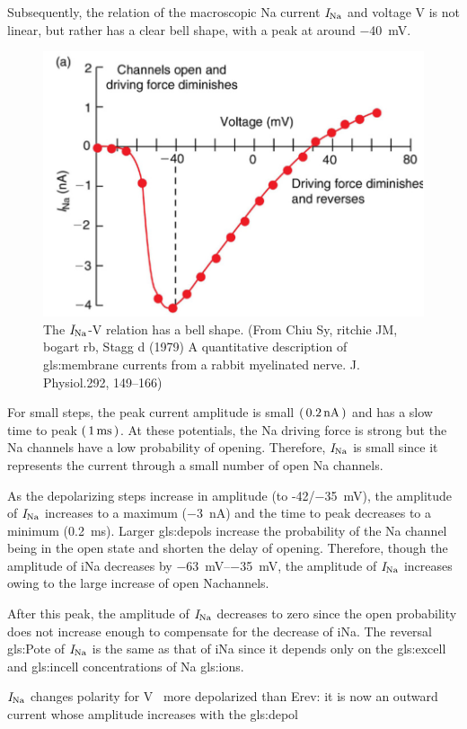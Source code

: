 \documentclass[class={myRUCProject}, crop=false]{standalone}
\begin{document}
Subsequently, the relation of the macroscopic \gls{Na} current \(\mathit{I}_\mathrm{Na}\) and voltage \(\unit{\V}\) is not linear, but rather has a clear bell shape, with a peak at around \qty{-40}{\mV}. 
\begin{figure}[H]
  \centering
  \includegraphics[width=0.5\linewidth]{Pictures//Anakin/I-V.bell.png}
  \caption{The \(\mathit{I}_\mathrm{Na}\)-V relation has a bell shape. (From Chiu Sy, ritchie JM, bogart rb, Stagg d (1979) A quantitative description of \gls{gls:membrane} currents from a rabbit myelinated nerve. J. Physiol.292, 149–166)}
  \label{fig:enter-label}
\end{figure}
 
For small steps, the peak current amplitude is small \(\br{\qty{0.2}{\nano\ampere}}\) and has a slow time to peak \(\br{\qty{1}{\milli\second}}\). At these potentials, the \gls{Na} driving force is strong but the \gls{Na} channels have a low probability of opening. Therefore, \(\mathit{I}_\mathrm{Na}\) is small since it represents the current through a small number of open \gls{Na} channels. 

As the depolarizing steps increase in amplitude (to -42/\qty{-35}{\mV}), the amplitude of \(\mathit{I}_\mathrm{Na}\) increases to a maximum (\qty{-3}{\nA}) and the time to peak decreases to a minimum (\qty{0.2}{\ms}). Larger \glspl{gls:depol} increase the probability of the \gls{Na} channel being in the open state and shorten the delay of opening. Therefore, though the amplitude of iNa decreases by \qtyrange{-63}{-35}{\mV}, the amplitude of \(\mathit{I}_\mathrm{Na}\) increases owing to the large increase of open \gls{Na}channels. 

After this peak, the amplitude of \(\mathit{I}_\mathrm{Na}\) decreases to zero since the open probability does not increase enough to compensate for the decrease of iNa. The reversal \gls{gls:Pote} of \(\mathit{I}_\mathrm{Na}\) is the same as that of iNa since it depends only on the \gls{gls:excell} and \gls{gls:incell} concentrations of \gls{Na} \glspl{gls:ion}.

\(\mathit{I}_\mathrm{Na}\) changes polarity for \unit{\V\membrane} more depolarized than Erev: it is now an outward current whose amplitude increases with the \gls{gls:depol} 
\end{document}
